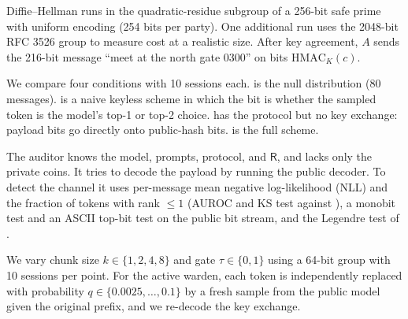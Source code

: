  Diffie--Hellman runs in the quadratic-residue subgroup of a 256-bit safe prime with uniform encoding (254 bits per party). One additional run uses the 2048-bit RFC 3526 group to measure cost at a realistic size. After key agreement, $A$ sends the 216-bit message ``meet at the north gate 0300'' on bits $\mathrm{HMAC}_K(c)$.



 We compare four conditions with 10 sessions each. \honest is the null distribution (80 messages). \rankcode is a naive keyless scheme in which the bit is whether the sampled token is the model's top-1 or top-2 choice. \publicplain has the protocol but no key exchange: payload bits go directly onto public-hash bits. \keylesske is the full scheme.

 The auditor knows the model, prompts, protocol, and $\mathsf{R}$, and lacks only the private coins. It tries to decode the payload by running the public decoder. To detect the channel it uses per-message mean negative log-likelihood (NLL) and the fraction of tokens with rank $\leq 1$ (AUROC and KS test against \honest), a monobit test and an ASCII top-bit test on the public bit stream, and the Legendre test of .

 We vary chunk size $k \in \{1,2,4,8\}$ and gate $\tau \in \{0,1\}$ using a 64-bit group with 10 sessions per point. For the active warden, each token is independently replaced with probability $q \in \{0.0025, \dots, 0.1\}$ by a fresh sample from the public model given the original prefix, and we re-decode the key exchange.
